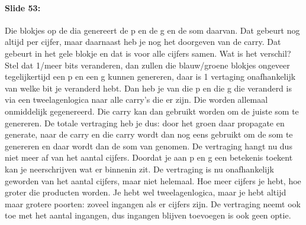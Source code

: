 \documentclass[10pt,a4paper]{book}
\begin{document}
\paragraph{Slide 53:} Die blokjes op de dia genereert de p en de g en de som daarvan. Dat gebeurt nog altijd per cijfer, maar daarnaast heb je nog het doorgeven van de carry. Dat gebeurt in het gele blokje en dat is voor alle cijfers samen. Wat is het verschil? Stel dat 1/meer bits veranderen, dan zullen die blauw/groene blokjes ongeveer tegelijkertijd een p en een g kunnen genereren, daar is 1 vertaging onafhankelijk van welke bit je veranderd hebt. Dan heb je van die p en die g die veranderd is via een tweelagenlogica naar alle carry's die er zijn. Die worden allemaal onmiddelijk gegenereerd. Die carry kan dan gebruikt worden om de juiste som te genereren. De totale vertraging heb je dus: door het groen daar propagate en generate, naar de carry en die carry wordt dan nog eens gebruikt om de som te genereren en daar wordt dan de som van genomen. De vertraging hangt nu dus niet meer af van het aantal cijfers. Doordat je aan p en g een betekenis toekent kan je neerschrijven wat er binnenin zit. De vertraging is nu onafhankelijk geworden van het aantal cijfers, maar niet helemaal. Hoe meer cijfers je hebt, hoe groter die producten worden. Je hebt wel tweelagenlogica, maar je hebt altijd maar grotere poorten: zoveel ingangen als er cijfers zijn. De vertraging neemt ook toe met het aantal ingangen, dus ingangen blijven toevoegen is ook geen optie.
\end{document}
